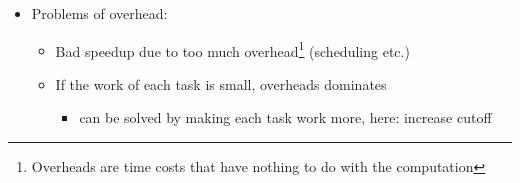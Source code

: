 \documentclass[a4paper]{article}
\newcommand{\inline}[1]{\lstinline!#1!}%
\begin{document}
\begin{itemize}
\begin{itemize}
\item \inline{.fork()}: creates a new task
\item \inline{.join()}: returns the result when task is done
\item \inline{.invoke()}: executes task without spawning a new task (in-place)
\item subclasses need to define \inline{compute()}
\end{itemize}
Note \inline{fork()}, , \inline{join()}, \inline{join()} don't work (well) in Java, solved by using\footnote{``+'' is in this case the arithmetic addition but can also be something else of a combining nature}
\begin{lstlisting}
t1.fork(), r2 = t2.compute()
return r2 + t1.join()
\end{lstlisting}
\item Problems of overhead: 
\begin{itemize}
\item Bad speedup due to too much overhead\footnote{Overheads are time costs that have nothing to do with the computation} (scheduling etc.)
\item If the work of each task is small, overheads dominates
\begin{itemize}
\item can be solved by making each task work more, here: increase cutoff
\end{itemize}
\end{itemize}
\end{itemize}
\end{document}
